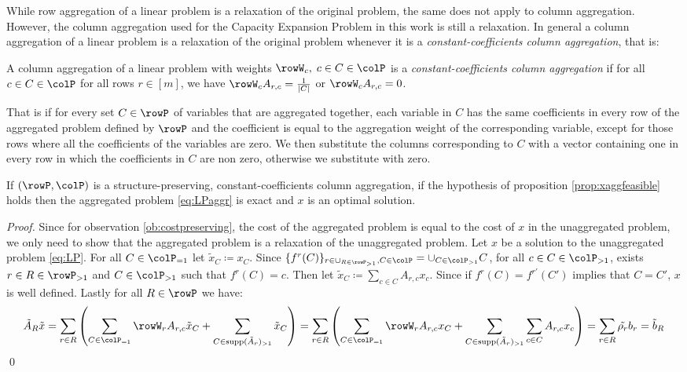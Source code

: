While row aggregation of a linear problem is a relaxation of the original problem, the same does not apply to column aggregation. However, the column aggregation used for the  Capacity Expansion Problem in this work is still a relaxation. In general a column aggregation of a linear problem is a relaxation of the original problem whenever it is a \emph{constant-coefficients column aggregation}, that is:
\begin{definition}
  A column aggregation  of a linear problem with weights \(\rowW_c,\; c \in C \in \colP \) is a \emph{constant-coefficients column aggregation}  if for all \(c \in C \in \colP\) for all rows \(r \in [m]\), we have \(\rowW_cA_{r,c} = \frac{1}{|C|}\) or  \(\rowW_cA_{r,c} = 0\).  
\end{definition}

That is if for every set \( C \in \rowP \) of variables that are aggregated together, each variable in \( C \) has the same coefficients in every row of the aggregated problem defined by \( \rowP \) and the coefficient is equal to the aggregation weight of the corresponding variable, except for those rows where all the coefficients of the variables are zero.
We then substitute the columns corresponding to \( C \) with a vector containing one in every row in which the coefficients in \(C\) are non zero, otherwise we substitute with zero.

\begin{proposition}
If \((\rowP,\colP)\) is a structure-preserving, constant-coefficients column aggregation,
if the hypothesis of proposition \ref{prop:xaggfeasible} holds then the aggregated problem \eqref{eq:LPaggr} is exact and \(x\) is an optimal solution.
\end{proposition}

\begin{proof}
  Since for observation \ref{ob:costpreserving}, the cost of the aggregated problem is equal to the cost of \(x\) in the unaggregated problem, we only need to show that the aggregated problem is a relaxation of the unaggregated problem.
  Let \(x\) be a solution to the unaggregated problem \eqref{eq:LP}. For all \(C \in \colP_{=1}\) let \(\tilde{x}_C \coloneqq x_C\).
  Since  \(\{f^r(C)\}_{r \in \cup_{R\in \rowP_{>1}}, C \in \colP} = \cup_{C \in \colP_{>1}}C\), for all \(c \in C \in \colP_{>1}\), exists \(r \in R \in \rowP_{>1}\) and \(C \in \colP_{>1}\) such that \(f^r(C) = c\).
  Then let \(\tilde{x}_C \coloneqq \sum_{c \in C}A_{r,c}x_c\). Since if \(f^{r}(C)= f^{r'}(C')\) implies that \(C=C'\), \(x\) is well defined.
  Lastly for all \(R \in \rowP\) we have:
  \[\tilde{A}_R\tilde{x} = \sum_{r \in R} \left( \sum_{C \in \colP_{=1}}\rowW_rA_{r,c}\tilde{x}_C + \sum_{C\in \supp(\tilde{A}_r)_{>1}} \tilde{x}_C \right) = \sum_{r \in R} \left( \sum_{C \in \colP_{=1}}\rowW_rA_{r,c}x_C + \sum_{C\in \supp(\tilde{A}_r)_{>1}} \sum_{c \in C}A_{r,c}x_c \right) = \sum_{r \in R} \tilde{\rho_r} b_r = \tilde{b}_R 
  \]
  \qed
\end{proof}


